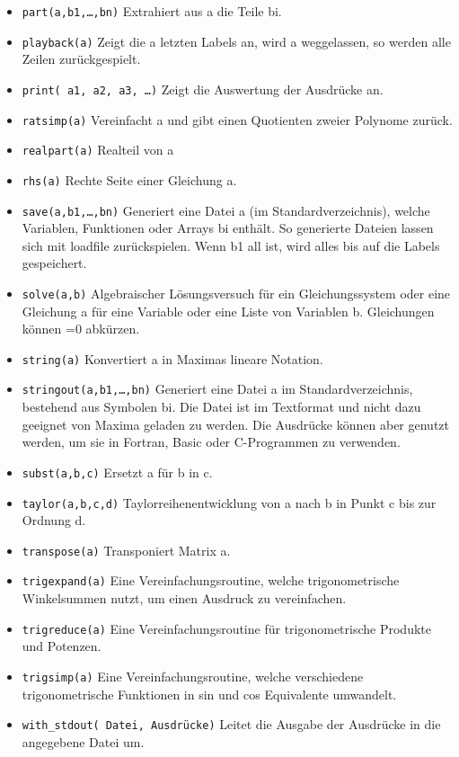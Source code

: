 \documentclass[ngerman,12pt]{scrartcl}
\begin{document}
\begin{itemize}
\item \texttt{part(a,b1,\ldots,bn)} Extrahiert aus a die Teile bi.
\item \texttt{playback(a)} Zeigt die a letzten Labels an, wird a
  weggelassen, so  werden alle Zeilen zurückgespielt.
\item \texttt{print( a1, a2, a3, \ldots )} Zeigt die Auswertung der
  Ausdrücke  an.
\item \texttt{ratsimp(a)} Vereinfacht a und gibt einen Quotienten zweier
  Polynome  zurück.
\item \texttt{realpart(a)} Realteil von a
\item \texttt{rhs(a)} Rechte Seite einer Gleichung a.
\item \texttt{save(a,b1,\ldots,bn)} Generiert eine Datei a (im
  Standardverzeichnis), welche Variablen, Funktionen oder Arrays bi
  enthält. So generierte Dateien  lassen sich mit loadfile
  zurückspielen. Wenn b1  all ist, wird alles bis auf die Labels gespeichert.
\item \texttt{solve(a,b)} Algebraischer Lösungsversuch für ein
  Gleichungssystem  oder eine Gleichung a für eine Variable oder eine
  Liste von  Variablen b. Gleichungen können =0 abkürzen.
\item \texttt{string(a)} Konvertiert a in Maximas lineare Notation.
\item \texttt{stringout(a,b1,\ldots,bn)} Generiert eine Datei a im
  Standardverzeichnis, bestehend aus Symbolen bi. Die Datei ist im
  Textformat und nicht dazu geeignet von Maxima geladen zu werden. Die
  Ausdrücke können aber genutzt werden,  um sie in Fortran, Basic oder
  C-Programmen  zu verwenden.
\item \texttt{subst(a,b,c)} Ersetzt a für b in c.
\item \texttt{taylor(a,b,c,d)} Taylorreihenentwicklung von a nach b in
  Punkt c  bis zur Ordnung d.
\item \texttt{transpose(a)} Transponiert Matrix a.
\item \texttt{trigexpand(a)} Eine Vereinfachungsroutine, welche
  trigonometrische  Winkelsummen nutzt, um einen Ausdruck zu vereinfachen.
\item \texttt{trigreduce(a)} Eine Vereinfachungsroutine für
  trigonometrische  Produkte und Potenzen.
\item \texttt{trigsimp(a)} Eine Vereinfachungsroutine, welche
  verschiedene  trigonometrische Funktionen in sin und cos Equivalente umwandelt.
\item \texttt{with\_stdout( Datei, Ausdrücke)} Leitet die Ausgabe der
  Ausdrücke  in die angegebene Datei um.
\end{itemize}
\end{document}
